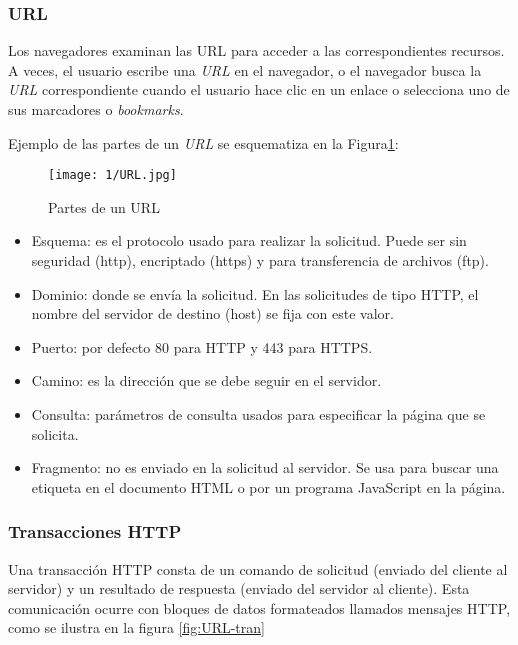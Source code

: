 	\subsubsection{URL}
	 Los navegadores examinan las \gls{URL}	  para acceder a las correspondientes recursos. A veces, el usuario escribe una \textit{URL} en el navegador, o el  navegador busca la \textit{URL} correspondiente cuando el usuario hace clic en un enlace o selecciona uno de sus marcadores o \textit{bookmarks}.
	
	
	
	Ejemplo de las partes de un \textit{URL} se esquematiza en la Figura\ref{fig:URL-HowWork}: 
	
	\begin{figure} %
		\texttt{[image: 1/URL.jpg]}
		\caption{Partes de un URL }
		\label{fig:URL-HowWork}
	\end{figure}

\begin{itemize}
	\item Esquema: es el protocolo usado para realizar la solicitud. Puede ser sin seguridad (http), encriptado (https) y para transferencia de archivos (ftp).
	\item Dominio: donde se envía la solicitud. En las solicitudes de tipo HTTP, el nombre del servidor de destino (host) se fija con este valor.
	\item Puerto: por defecto 80 para HTTP y 443 para HTTPS.
	\item Camino: es la dirección que se debe seguir en el servidor.
	\item Consulta: parámetros de consulta usados para especificar la página que se solicita.
	\item Fragmento: no es enviado en la solicitud al servidor. Se usa para buscar una etiqueta en el documento HTML o por un programa JavaScript en la página.
\end{itemize}
 

	\subsubsection{Transacciones HTTP} 
	Una transacción HTTP consta de un comando de solicitud (enviado del cliente al servidor) y un resultado de respuesta (enviado del servidor al cliente). Esta comunicación ocurre con bloques de datos formateados llamados mensajes HTTP, como se ilustra en la figura \ref{fig:URL-tran}
	
